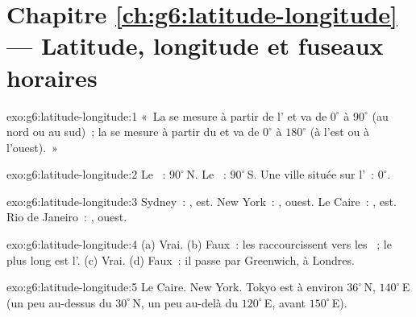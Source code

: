 \section*{Chapitre \ref{ch:g6:latitude-longitude} --- Latitude, longitude et fuseaux horaires}

\begin{solution}{exo:g6:latitude-longitude:1}
«~La  se mesure à partir de l' et va de $0^\circ$ à
$90^\circ$ (au nord ou au sud)~; la  se mesure à partir du
 et va de $0^\circ$ à $180^\circ$ (à l'est ou à
l'ouest).~»
\end{solution}

\begin{solution}{exo:g6:latitude-longitude:2}
Le ~: $90^\circ$\,N. Le ~: $90^\circ$\,S. Une ville
située sur l'~: $0^\circ$.
\end{solution}

\begin{solution}{exo:g6:latitude-longitude:3}
Sydney~: , est. New York~: , ouest. Le
Caire~: , est. Rio de Janeiro~: , ouest.
\end{solution}

\begin{solution}{exo:g6:latitude-longitude:4}
(a) Vrai. (b) Faux~: les  raccourcissent vers les ~; le plus
long est l'. (c) Vrai. (d) Faux~: il passe par Greenwich, à
Londres.
\end{solution}

\begin{solution}{exo:g6:latitude-longitude:5}
Le Caire. New York. Tokyo est à environ $36^\circ$\,N, $140^\circ$\,E (un
peu au-dessus du  $30^\circ$\,N, un peu au-delà du 
$120^\circ$\,E, avant $150^\circ$\,E).
\end{solution}

